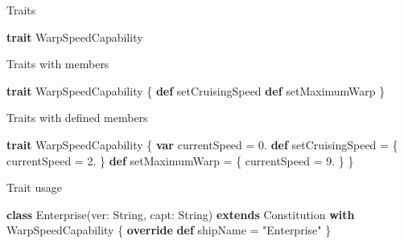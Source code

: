 \documentclass[ignorenonframetext,]{beamer}
\newenvironment{Shaded}{\begin{snugshade}}{\end{snugshade}}
\newcommand{\KeywordTok}[1]{\textcolor[rgb]{0.13,0.29,0.53}{\textbf{#1}}}
\newcommand{\FloatTok}[1]{\textcolor[rgb]{0.00,0.00,0.81}{#1}}
\newcommand{\StringTok}[1]{\textcolor[rgb]{0.31,0.60,0.02}{#1}}
\newcommand{\FunctionTok}[1]{\textcolor[rgb]{0.00,0.00,0.00}{#1}}
\newcommand{\NormalTok}[1]{#1}
\begin{document}
\begin{frame}[fragile]{Traits}

\begin{Shaded}
\begin{Highlighting}[]
\KeywordTok{trait}\NormalTok{ WarpSpeedCapability}
\end{Highlighting}
\end{Shaded}

\begin{block}{Traits with members}

\begin{Shaded}
\begin{Highlighting}[]
\KeywordTok{trait}\NormalTok{ WarpSpeedCapability \{}
    \KeywordTok{def}\NormalTok{ setCruisingSpeed}
    \KeywordTok{def}\NormalTok{ setMaximumWarp}
\NormalTok{\}}
\end{Highlighting}
\end{Shaded}

\end{block}

\begin{block}{Traits with defined members}

\begin{Shaded}
\begin{Highlighting}[]
\KeywordTok{trait}\NormalTok{ WarpSpeedCapability \{}
    \KeywordTok{var}\NormalTok{ currentSpeed = }\FloatTok{0.}
    \KeywordTok{def}\NormalTok{ setCruisingSpeed = \{ currentSpeed = }\FloatTok{2.}\NormalTok{ \}}
    \KeywordTok{def}\NormalTok{ setMaximumWarp = \{ currentSpeed = }\FloatTok{9.}\NormalTok{ \}}
\NormalTok{\}}
\end{Highlighting}
\end{Shaded}

\end{block}

\begin{block}{Trait usage}

\begin{Shaded}
\begin{Highlighting}[]
\KeywordTok{class} \FunctionTok{Enterprise}\NormalTok{(ver: String, capt: String) }
\KeywordTok{extends}\NormalTok{ Constitution }\KeywordTok{with}\NormalTok{ WarpSpeedCapability \{}
    \KeywordTok{override} \KeywordTok{def}\NormalTok{ shipName = }\StringTok{"Enterprise"}
\NormalTok{\}}
\end{Highlighting}
\end{Shaded}

\end{block}


\end{frame}
\end{document}
